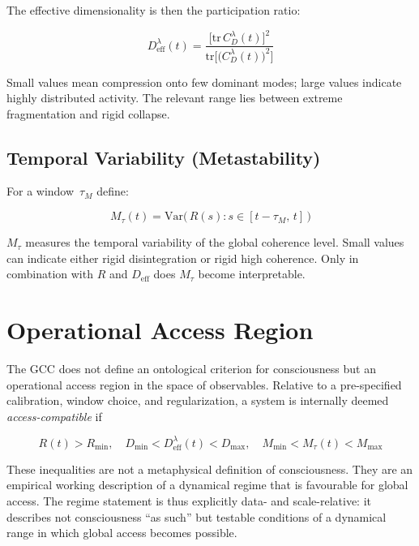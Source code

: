 ﻿\documentclass[11pt,a4paper]{article}
\theoremstyle{plain}
\theoremstyle{definition}
\theoremstyle{remark}
\newcommand{\Deff}{D_{\mathrm{eff}}}
\newcommand{\Mtau}{M_{\tau}}
\newcommand{\Rmin}{R_{\min}}
\newcommand{\Dmin}{D_{\min}}
\newcommand{\Dmax}{D_{\max}}
\newcommand{\Mmin}{M_{\min}}
\newcommand{\Mmax}{M_{\max}}
\begin{document}
The effective dimensionality is then the participation ratio:

\begin{equation}
\label{eq:Deff}
\boxed{\;\Deff^{\lambda}(t) = \frac{\bigl[\mathrm{tr}\,C_D^{\lambda}(t)\bigr]^2}{\mathrm{tr}\!\bigl[\bigl(C_D^{\lambda}(t)\bigr)^2\bigr]}\;}
\end{equation}

Small values mean compression onto few dominant modes; large values indicate highly distributed activity. The relevant range lies between extreme fragmentation and rigid collapse.

\subsection{Temporal Variability (Metastability)}

For a window~$\tau_M$ define:

\begin{equation}
\label{eq:Mtau}
\Mtau(t) = \mathrm{Var}\!\bigl(\,R(s) : s \in [t - \tau_M,\, t]\,\bigr)
\end{equation}

$\Mtau$ measures the temporal variability of the global coherence level. Small values can indicate either rigid disintegration or rigid high coherence. Only in combination with $R$ and $\Deff$ does $\Mtau$ become interpretable.


\section{Operational Access Region}
\label{sec:access-region}
\label{sec:zugang}

The GCC does not define an ontological criterion for consciousness but an operational access region in the space of observables. Relative to a pre-specified calibration, window choice, and regularization, a system is internally deemed \emph{access-compatible} if

\begin{equation}
\label{eq:zugang}
\boxed{\;
R(t) > \Rmin, \quad
\Dmin < \Deff^{\lambda}(t) < \Dmax, \quad
\Mmin < \Mtau(t) < \Mmax
\;}
\end{equation}

These inequalities are not a metaphysical definition of consciousness. They are an empirical working description of a dynamical regime that is favourable for global access. The regime statement is thus explicitly data- and scale-relative: it describes not consciousness ``as such'' but testable conditions of a dynamical range in which global access becomes possible.
\end{document}
